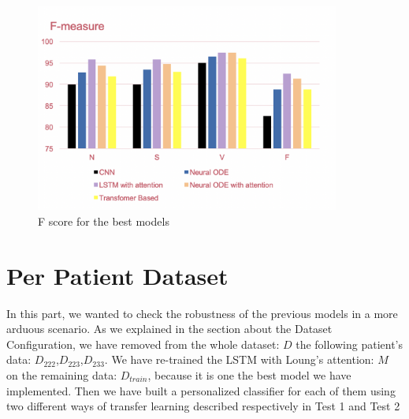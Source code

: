 \documentclass[LaM,binding=0.6cm]{sapthesis}
\begin{document}
\begin{figure}  \centering
    \includegraphics[width=100mm,scale=0.7]{fscore}
    \caption{F score for the best models }
    \label{fig:fscore}
\end{figure}


\section{Per Patient Dataset}
In this part, we wanted to check the robustness of the previous models in a more arduous scenario. As we explained in the section about the Dataset Configuration, we have removed from the whole dataset: $D$ the following patient's data: $D_{222}$,$D_{223}$,$D_{233}$. We have re-trained the LSTM with Loung's attention: $M$ on the remaining data: $D_{train}$, because it is one the best model we have implemented. Then we have built a personalized classifier for each of them using two different ways of transfer learning described respectively in Test 1 and Test 2
\end{document}
